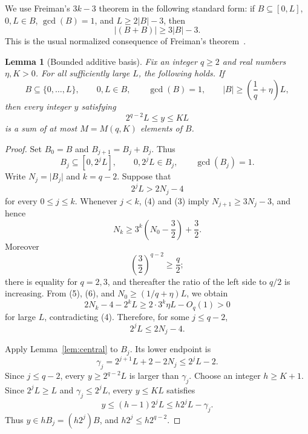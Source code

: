 \documentclass[10pt,reqno]{amsart}
\newtheorem{lemma}[theorem]{Lemma}
\theoremstyle{remark}
\newcommand{\card}[1]{\lvert #1\rvert}
\begin{document}
We use Freiman's $3k-3$ theorem in the following standard form: if
$B\subseteq[0,L]$, $0,L\in B$, $\gcd(B)=1$, and
$L\geq2\card B-3$, then
\[
 \card{(B+B)}\geq3\card B-3. \tag{3}
\]
This is the usual normalized consequence of Freiman's theorem~\cite{HP}.

\begin{lemma}[Bounded additive basis]\label{lem:basis}
Fix an integer $q\geq2$ and real numbers $\eta,K>0$.
For all sufficiently large $L$, the following holds.
If
\[
 B\subseteq\{0,\ldots,L\},\qquad
 0,L\in B,\qquad \gcd(B)=1,
 \qquad
 \card B\geq\left(\frac1q+\eta\right)L,
\]
then every integer $y$ satisfying
\[
 2^{q-2}L\leq y\leq KL
\]
is a sum of at most $M=M(q,K)$ elements of $B$.
\end{lemma}

\begin{proof}
Set $B_0=B$ and $B_{j+1}=B_j+B_j$.  Thus
\[
 B_j\subseteq[0,2^jL],\qquad 0,2^jL\in B_j,
 \qquad \gcd(B_j)=1.
\]
Write $N_j=\card{B_j}$ and $k=q-2$.  Suppose that
\[
 2^jL>2N_j-4 \tag{4}
\]
for every $0\leq j\leq k$.  Whenever $j<k$, (4) and (3) imply
$N_{j+1}\geq3N_j-3$, and hence
\[
 N_k\geq3^k\left(N_0-\frac32\right)+\frac32. \tag{5}
\]
Moreover
\[
 \left(\frac32\right)^{q-2}\geq\frac q2; \tag{6}
\]
there is equality for $q=2,3$, and thereafter the ratio of the left side to $q/2$ is increasing.  From (5), (6), and $N_0\geq(1/q+\eta)L$, we obtain
\[
 2N_k-4-2^kL\geq2\cdot3^k\eta L-O_q(1)>0
\]
for large $L$, contradicting (4).  Therefore, for some $j\leq q-2$,
\[
 2^jL\leq2N_j-4. \tag{7}
\]

Apply Lemma~\ref{lem:central} to $B_j$.  Its lower endpoint is
\[
 \gamma_j=2^{j+1}L+2-2N_j\leq2^jL-2.
\]
Since $j\leq q-2$, every $y\geq2^{q-2}L$ is larger than $\gamma_j$.  Choose an integer $h\geq K+1$.  Since $2^jL\geq L$ and $\gamma_j\leq2^jL$, every $y\leq KL$ satisfies
\[
 y\leq(h-1)2^jL\leq h2^jL-\gamma_j.
\]
Thus $y\in hB_j=(h2^j)B$, and $h2^j\leq h2^{q-2}$.
\end{proof}
\end{document}
